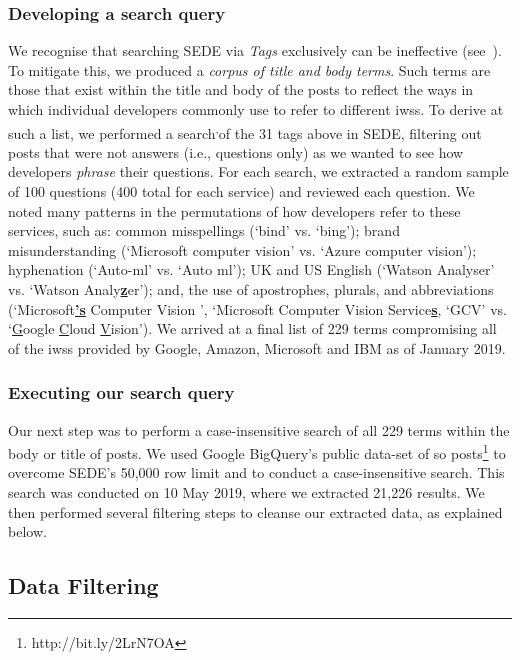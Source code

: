 \subsubsection{Developing a search query}
We recognise that searching SEDE via \textit{Tags} exclusively can be ineffective (see~\citep{Tahir:2018ks,Barua:2012gz}). To mitigate this, we produced a \textit{corpus of title and body terms}. Such terms are those that exist within the title and body of the posts to reflect the ways in which individual developers commonly use to refer to different \glspl{iws}. To derive at such a list, we performed a search\footnotemark[\footnotesearchdate{}]\textsuperscript{,}\footnotemark[\footnotereproducability{}] of the 31 tags above in SEDE, filtering out posts that were not answers (i.e., questions only) as we wanted to see how developers \textit{phrase} their questions. For each search, we extracted a random sample of 100 questions (400 total for each service) and reviewed each question. We noted many patterns in the permutations of how developers refer to these services, such as: common misspellings (`bind' vs. `bing'); brand misunderstanding (`Microsoft computer vision' vs. `Azure computer vision'); hyphenation (`Auto-\gls{ml}' vs. `Auto \gls{ml}'); UK and US English (`Watson Analyser' vs. `Watson Analy\uline{\textbf{z}}er'); and, the use of apostrophes, plurals, and abbreviations (`Microsoft\uline{\textbf{'s}} Computer Vision ', `Microsoft Computer Vision Service\uline{\textbf{s}}, `GCV' vs. `\uline{G}oogle \uline{C}loud \uline{V}ision'). We arrived at a final list of 229 terms compromising all of the \glspl{iws} provided by Google, Amazon, Microsoft and IBM as of January 2019\footnotemark[3].

\subsubsection{Executing our search query}

Our next step was to perform a case-insensitive search of all 229 terms within the body or title of posts. We used Google BigQuery's public data-set of \gls{so} posts\footnote{http://bit.ly/2LrN7OA} to overcome SEDE's 50,000 row limit and to conduct a case-insensitive search. This search was conducted on 10 May 2019, where we extracted 21,226 results. We then performed several filtering steps to cleanse our extracted data, as explained below.

\subsection{Data Filtering}
\label{icse2020:ssec:method:filtering}



